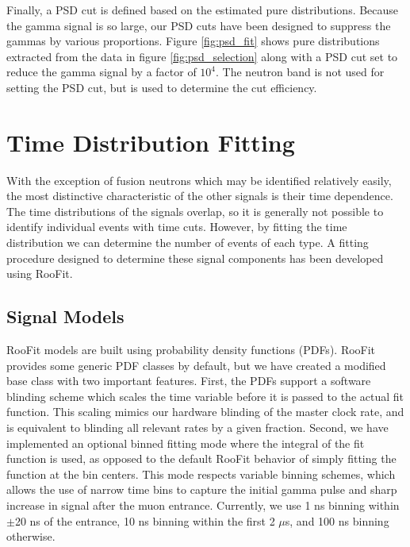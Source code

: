 Finally, a PSD cut is defined based on the estimated pure distributions.
Because the gamma signal is so large, our PSD cuts have been designed to suppress the gammas by various proportions.
Figure \ref{fig:psd_fit} shows pure distributions extracted from the data in figure \ref{fig:psd_selection} along with a PSD cut set to reduce the gamma signal by a factor of $10^{4}$.
The neutron band is not used for setting the PSD cut, but is used to determine the cut efficiency.

\section{Time Distribution Fitting}

With the exception of fusion neutrons which may be identified relatively easily, the most distinctive characteristic of the other signals is their time dependence.  
The time distributions of the signals overlap, so it is generally not possible to identify individual events with time cuts.  
However, by fitting the time distribution we can determine the number of events of each type.
A fitting procedure designed to determine these signal components has been developed using RooFit.

\subsection{Signal Models}

RooFit models are built using probability density functions (PDFs).  
RooFit provides some generic PDF classes by default, but we have created a modified base class with two important features.
First, the PDFs support a software blinding scheme which scales the time variable before it is passed to the actual fit function.
This scaling mimics our hardware blinding of the master clock rate, and is equivalent to blinding all relevant rates by a given fraction.
Second, we have implemented an optional binned fitting mode where the integral of the fit function is used, as opposed to the default RooFit behavior of simply fitting the function at the bin centers.  
This mode respects variable binning schemes, which allows the use of narrow time bins to capture the initial gamma pulse and sharp increase in signal after the muon entrance.  
Currently, we use 1 ns binning within $\pm$20 ns of the entrance, 10 ns binning within the first 2 $\mu$s, and 100 ns binning otherwise.

